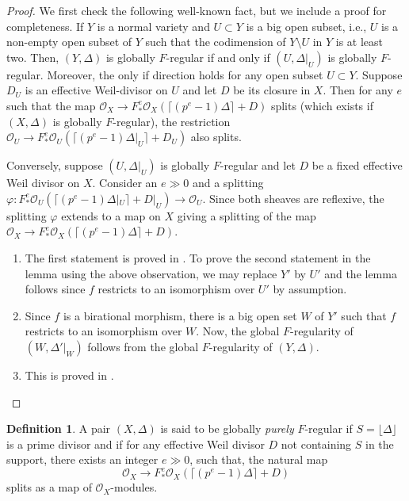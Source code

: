 \documentclass[11pt,reqno]{amsart}
\newcommand{\cO}{\mathcal{O}}
\numberwithin{equation}{section}
\theoremstyle{definition}
\newtheorem{defi}[prop] {Definition}
\begin{document}
\begin{proof}
We first check the following well-known fact, but we include a proof for completeness. If $Y$ is a normal variety and $U \subset Y$ is a big open subset, i.e., $U$ is a non-empty open subset of $Y$ such that the codimension of $Y \setminus U$ in $Y$ is at least two. Then, $(Y, \Delta)$ is globally $F$-regular if and only if $(U, \Delta|_U)$ is globally $F$-regular. Moreover, the only if direction holds for any open subset $U \subset Y$. Suppose $D_U$ is an effective Weil-divisor on $U$ and let $D$ be its closure in $X$. Then for any $e$ such that the map $\cO_X \to F_* ^e \cO_X( \lceil (p^e -1) \Delta \rceil + D)$ splits (which exists if $(X, \Delta)$ is globally $F$-regular), the restriction $\cO_U \to F_* ^e \cO_U( \lceil (p^e -1) \Delta|_U \rceil + D_U) $ also splits.

        Conversely, suppose $(U, \Delta|_U)$ is globally $F$-regular and let $D$ be a fixed effective Weil divisor on $X$. Consider an $e \gg 0 $ and a splitting $\varphi: F_* ^e \cO_U( \lceil (p^e -1) \Delta|_U \rceil + D|_U) \to \cO_U$. Since both sheaves are reflexive, the splitting $\varphi$ extends to a map on $X$ giving a splitting of the map $\cO_X \to F_* ^e \cO_X (\lceil (p^e -1 ) \Delta \rceil + D)$.
    \begin{enumerate}
        \item The first statement is proved in \cite[Proposition 6.3]{SchwedeSmithLogFanoVsGloballyFRegular}.
        To prove the second statement in the lemma using the above observation, we may replace $Y'$ by $U'$ and the lemma follows since $f$ restricts to an isomorphism over $U'$ by assumption.

        \item Since $f$ is a birational morphism, there is a big open set $W $ of $Y'$ such that $f$ restricts to an isomorphism over $W$. Now, the global $F$-regularity of $(W, \Delta' |_W)$ follows from the global $F$-regularity of $(Y, \Delta)$. 

        \item This is proved in \cite[Proposition 2.11]{HaconXuThreeDimensionalMinimalModel}. \qedhere
        \end{enumerate}
\end{proof}

\begin{defi}
    A pair $(X, \Delta)$ is said to be globally \emph{purely} $F$-regular if $S = \lfloor \Delta \rfloor $ is a prime divisor and if for any effective Weil divisor $D$ not containing $S$ in the support, there exists an integer $e \gg 0$, such that, the natural map 
\begin{equation*} 
\cO_X \to F^e_* \cO_X( \lceil (p^e -1) \Delta \rceil + D)
 \end{equation*}
splits as a map of $\cO_{X}$-modules.
\end{defi}
\end{document}
